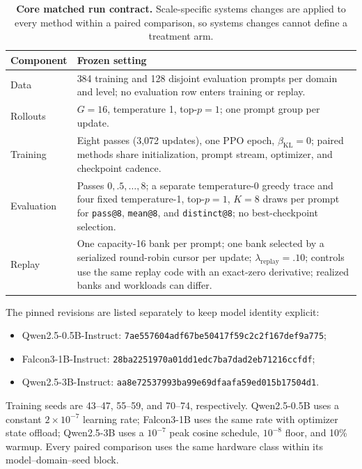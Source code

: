 \documentclass{article}
\newcommand{\1}{\mathbf 1}
\theoremstyle{remark}
\theoremstyle{definition}
\theoremstyle{plain}
\begin{document}
\begin{table}[H]
  \centering
  \caption{\textbf{Core matched run contract.} Scale-specific systems changes
  are applied to every method within a paired comparison, so systems changes
  cannot define a treatment arm.}
  \label{tab:run-contract}
  \small
  \begin{tabularx}{\linewidth}{@{}P{.24\linewidth}Y@{}}
    \toprule
    \textbf{Component} & \textbf{Frozen setting} \\
    \midrule
    Data & 384 training and 128 disjoint evaluation prompts per domain and
      level; no evaluation row enters training or replay. \\
    Rollouts & $G=16$, temperature 1, top-$p=1$; one prompt group per update. \\
    Training & Eight passes (3,072 updates), one PPO epoch,
      $\beta_{\mathrm{KL}}=0$; paired methods share initialization, prompt stream,
      optimizer, and checkpoint cadence. \\
    Evaluation & Passes $0,.5,\ldots,8$; a separate temperature-0 greedy
      trace and four fixed temperature-1, top-$p=1$, $K=8$ draws per prompt for
      \texttt{pass@8}, \texttt{mean@8}, and \texttt{distinct@8}; no
      best-checkpoint selection. \\
    Replay & One capacity-16 bank per prompt; one bank selected by a serialized
      round-robin cursor per update; $\lambda_{\mathrm{replay}}=.10$; controls
      use the same replay code with an exact-zero derivative; realized banks and workloads can differ. \\
    \bottomrule
  \end{tabularx}
\end{table}

The pinned revisions are listed separately to keep model identity explicit:
\begin{itemize}
  \item Qwen2.5-0.5B-Instruct: {\scriptsize\texttt{7ae557604adf67be50417f59c2c2f167def9a775}};
  \item Falcon3-1B-Instruct: {\scriptsize\texttt{28ba2251970a01dd1edc7ba7dad2eb71216ccfdf}};
  \item Qwen2.5-3B-Instruct: {\scriptsize\texttt{aa8e72537993ba99e69dfaafa59ed015b17504d1}}.
\end{itemize}
Training seeds are 43--47, 55--59, and 70--74, respectively. Qwen2.5-0.5B uses a constant
$2\times10^{-7}$ learning rate; Falcon3-1B uses the same rate with optimizer
state offload; Qwen2.5-3B uses a $10^{-7}$ peak cosine schedule, $10^{-8}$
floor, and 10\% warmup. Every paired comparison uses the same hardware class
within its model--domain--seed block.
\end{document}
